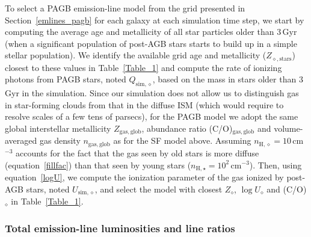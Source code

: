 \documentclass[fleqn,usenatbib]{mnras}
\begin{document}
To select a PAGB emission-line model from the grid presented in
Section~\ref{emlines_pagb} for each galaxy at each simulation time
step, we start by computing the average age and metallicity of all
star particles older than 3\,Gyr (when a significant  population of
post-AGB stars starts to build up in a simple stellar population). We
identify the available grid age and metallicity ($Z_{\diamond,
  \mathrm{stars}}$) closest to these  values in Table~\ref{Table_1}
and compute the rate of ionizing photons from PAGB stars, noted
$Q_{\mathrm{sim},\diamond}$, based on the mass in stars older than
3\,Gyr in the  simulation. Since our simulation does not allow us to
distinguish gas in  star-forming clouds from that in the diffuse ISM
(which would require to resolve scales of a few tens of parsecs), for
the PAGB model we adopt the same global interstellar  metallicity
$Z_{\mathrm{gas,glob}}$, abundance ratio (C/O)$_{\mathrm{gas, glob}}$
and  volume-averaged gas density  $n_{\mathrm{gas, glob}}$ as for
the SF model above.  Assuming $n_{\mathrm{H}, \diamond} =
10\,$cm$^{-3}$ accounts for the fact that the gas seen by old stars is
more diffuse (equation~\ref{fillfac}) than that seen by young stars
($n_{\mathrm{H}, \star} =10^2\,$cm$^{-3}$). Then, using
equation~\eqref{logU}, we compute the ionization parameter of the gas
ionized by post-AGB stars, noted  $U_{\mathrm{sim},\diamond}$, and
select the model with closest  $Z_{\diamond}$, $\log U_{\diamond}$ and
(C/O)$_\diamond$ in Table~\ref{Table_1}. 

\subsubsection{Total emission-line luminosities and line ratios}
\end{document}
